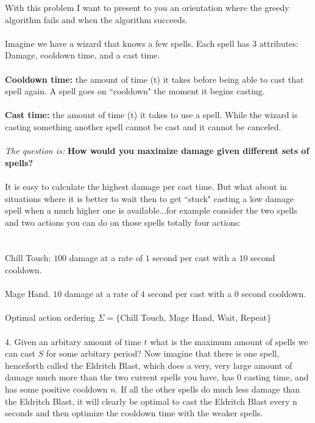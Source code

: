 \documentclass[12pt]{article}
\begin{document}
\newpage
\noindent With this problem I want to present to you an orientation where the 
greedy algorithm fails and when the algorithm succeeds.\\\\
Imagine we have a wizard that knows a few spells. 
Each spell has 3 attributes: Damage, cooldown time, and a cast time. \\\\
\textbf{Cooldown time:} the amount of time (t) it takes 
before being able to cast that spell again. 
A spell goes on ``cooldown" the moment it begins casting.\\\\
\textbf{Cast time:} the amount of time (t) it takes 
to use a spell. While the wizard is casting 
something another spell cannot be cast and 
it cannot be canceled. \\\\
\textit{The question is:} \textbf{How would you maximize damage 
given different sets of spells?} \\\\
It is easy to calculate the highest damage per cast 
time. But what about in situations where it is better 
to wait then to get ``stuck" casting a low damage 
spell when a much higher one is available...for example consider
the two spells and two actions you can do on those spells totally four actions:\\\\\\
Chill Touch: $100$ damage at a rate of $1$ second per cast with a $10$ second cooldown. \\\\
Mage Hand. $10$ damage at a rate of $4$ second per cast with a $0$ second cooldown.\\\\
Optimal action ordering $\Sigma =\{$Chill Touch, Mage Hand, Wait, Repeat$\}$\\\\
4. Given an arbitary amount of time $t$ what is the maximum amount of spells
we can cast $S$ for some arbitary period?
\newpage
\noindent Now imagine that there is one spell, henceforth called the Eldritch Blast, 
which does a very, very large amount of damage much more than the two current spells you have, has $0$ casting time, and has 
some positive cooldown $n$. If all the other spells do much less damage than the 
Eldritch Blast, it will clearly be optimal to cast the Eldritch Blast every n seconds and 
then optimize the cooldown time with the weaker spells.\\\\
\end{document}
